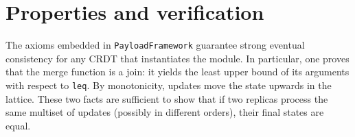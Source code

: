 \section{Properties and verification}

The axioms embedded in \texttt{PayloadFramework} guarantee strong eventual consistency for any CRDT that instantiates the module.  In particular, one proves that the merge function is a join: it yields the least upper bound of its arguments with respect to \texttt{leq}.  By monotonicity, updates move the state upwards in the lattice.  These two facts are sufficient to show that if two replicas process the same multiset of updates (possibly in different orders), their final states are equal.

\endinput